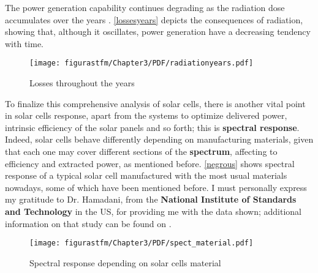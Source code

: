 The power generation capability continues degrading as the radiation dose accumulates over the years \cite{spacecraftspower}. \autoref{lossesyears} depicts the consequences of radiation, showing that, although it oscillates, power generation have a decreasing tendency with time. 

\begin{figure} [H] 				
				\centering
				\texttt{[image: figurastfm/Chapter3/PDF/radiationyears.pdf]}
				\caption{Losses throughout the years \cite{spacecraftspower}} \label{lossesyears}
				\vspace{-1cm}
			\end{figure}




	
			To finalize this comprehensive analysis of solar cells, there is another vital point in solar cells response, apart from the systems to optimize delivered power, intrinsic efficiency of the solar panels and so forth; this is \textbf{spectral response}. Indeed, solar cells behave differently depending on manufacturing materials, given that each one may cover different sections of the \textbf{spectrum}, affecting to efficiency and extracted power, as mentioned before. \autoref{negrous} shows spectral response of a typical solar cell manufactured with the most usual materials nowadays, some of which have been mentioned before. I must personally express my gratitude to Dr. Hamadani, from the \textbf{National Institute of Standards and Technology} in the US, for providing me with the data shown; additional information on that study can be found on \cite{hamadani}.
			
						
	\begin{figure} [h] 				
				\centering
				\texttt{[image: figurastfm/Chapter3/PDF/spect\_material.pdf]}
				\caption{Spectral response depending on solar cells material} \label{negrous}
			\end{figure}			
			
